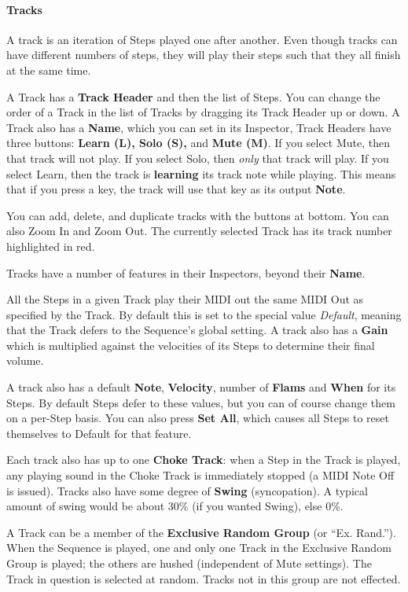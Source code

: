 \documentclass[twoside,10pt]{article}
\begin{document}
\paragraph{Tracks}

A track is an iteration of Steps played one after another.  Even though tracks can have different numbers of steps, they will play their steps such that they all finish at the same time.

A Track has a {\bf Track Header} and then the list of Steps.  You can change the order of a Track in the list of Tracks by dragging its Track Header up or down.  A Track also has a {\bf Name}, which you can set in its Inspector,  Track Headers have three buttons: {\bf Learn (L), Solo (S),} and {\bf Mute (M)}.  If you select Mute, then that track will not play.  If you select Solo, then {\it only} that track will play.  If you select Learn, then the track is {\bf learning} its track note while playing.  This means that if you press a key, the track will use that key as its output {\bf Note}.     

You can add, delete, and duplicate tracks with the buttons at bottom.  You can also Zoom In and Zoom Out.  The currently selected Track has its track number highlighted in red.

Tracks have a number of features in their Inspectors, beyond their {\bf Name}.

All the Steps in a given Track play their MIDI out the same MIDI Out as specified by the Track.  By default this is set to the special value {\it Default}, meaning that the Track defers to the Sequence's global setting.  A track also has a {\bf Gain} which is multiplied against the velocities of its Steps to determine their final volume.  

A track also has a default {\bf Note}, {\bf Velocity}, number of {\bf Flams} and {\bf When} for its Steps.  By default Steps defer to these values, but you can of course change them on a per-Step basis.  You can also press {\bf Set All}, which causes all Steps to reset themselves to Default for that feature.

Each track also has up to one {\bf Choke Track}: when a Step in the Track is played, any playing sound in the Choke Track is immediately stopped (a MIDI Note Off is issued).  Tracks also have some degree of {\bf Swing} (syncopation).  A typical amount of swing would be about 30\% (if you wanted Swing), else 0\%.

A Track can be a member of the {\bf Exclusive Random Group} (or ``Ex. Rand.'').  When the Sequence is played, one and only one Track in the Exclusive Random Group is played; the others are hushed (independent of Mute settings).  The Track in question is selected at random. Tracks not in this group are not effected.
\end{document}
